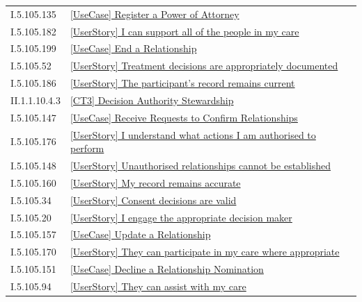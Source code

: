 \begin{longtable}{p{.22\linewidth}p{.73\linewidth}}
I.5.105.135 & \hyperref[element:02623efd74d74442b02648ec2d75f2ea]{[UseCase] Register a Power of Attorney} \\
I.5.105.182 & \hyperref[element:0560657f56f444acac2b8f7cd03d49b8]{[UserStory] I can support all of the people in my care} \\
I.5.105.199 & \hyperref[element:072e0721bf364765b4a2942a47db9b16]{[UseCase] End a Relationship} \\
I.5.105.52 & \hyperref[element:0804466d75ad43c8ac740ac47e37fb95]{[UserStory] Treatment decisions are appropriately documented} \\
I.5.105.186 & \hyperref[element:09ede8273aa548b2a4c01037dadec92b]{[UserStory] The participant's record remains current} \\
II.1.1.10.4.3 & \hyperref[element:0a6a09b437284490a8eaeca204c7649b]{[CT3] Decision Authority Stewardship} \\
I.5.105.147 & \hyperref[element:0a9b925182484d478e1c03bf3c7e7403]{[UseCase] Receive Requests to Confirm Relationships} \\
I.5.105.176 & \hyperref[element:0b904e96346e4787a05f1b153ae64be4]{[UserStory] I understand what actions I am authorised to perform} \\
I.5.105.148 & \hyperref[element:0c31b4227a634971a72ce5064727bd49]{[UserStory] Unauthorised relationships cannot be established} \\
I.5.105.160 & \hyperref[element:0c4c3916e6ec4e248527ef290267d8e5]{[UserStory] My record remains accurate} \\
I.5.105.34 & \hyperref[element:0cf63af1646f446c91ee6a9dc2a73750]{[UserStory] Consent decisions are valid} \\
I.5.105.20 & \hyperref[element:0e15653058994cf59d708a167aaaaf35]{[UserStory] I engage the appropriate decision maker} \\
I.5.105.157 & \hyperref[element:10500030d4bd4b8e900450a671254d6e]{[UseCase] Update a Relationship} \\
I.5.105.170 & \hyperref[element:1774e2407dc94f47b1e3bf7f4d0caae0]{[UserStory] They can participate in my care where appropriate} \\
I.5.105.151 & \hyperref[element:17794362b2d346cb9d91648df18ca9a7]{[UseCase] Decline a Relationship Nomination} \\
I.5.105.94 & \hyperref[element:17993cf2997e484c9d9daa3e30c81fb0]{[UserStory] They can assist with my care} \\

\end{longtable}
